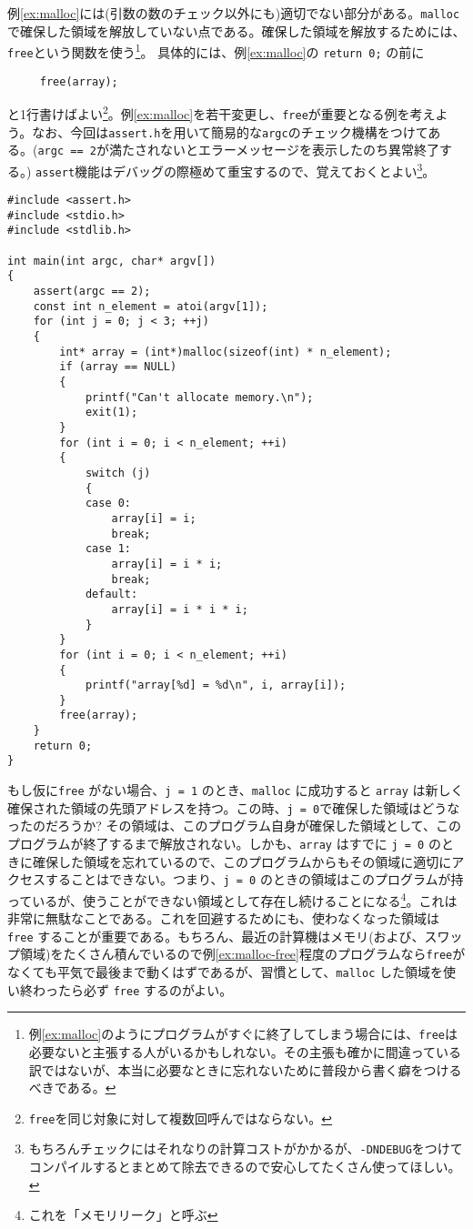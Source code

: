例\ref{ex:malloc}には(引数の数のチェック以外にも)適切でない部分がある。\texttt{malloc}で確保した領域を解放していない点である。確保した領域を解放するためには、\texttt{free}という関数を使う\footnote{例\ref{ex:malloc}のようにプログラムがすぐに終了してしまう場合には、\texttt{free}は必要ないと主張する人がいるかもしれない。その主張も確かに間違っている訳ではないが、本当に必要なときに忘れないために普段から書く癖をつけるべきである。}。
具体的には、例\ref{ex:malloc}の \texttt{return 0;} の前に
\begin{verbatim}
     free(array);
\end{verbatim}
と1行書けばよい\footnote{\texttt{free}を同じ対象に対して複数回呼んではならない。}。例\ref{ex:malloc}を若干変更し、\texttt{free}が重要となる例を考えよう。なお、今回は\texttt{assert.h}を用いて簡易的な\texttt{argc}のチェック機構をつけてある。(\texttt{argc == 2}が満たされないとエラーメッセージを表示したのち異常終了する。)
\texttt{assert}機能はデバッグの際極めて重宝するので、覚えておくとよい\footnote{もちろんチェックにはそれなりの計算コストがかかるが、\texttt{-DNDEBUG}をつけてコンパイルするとまとめて除去できるので安心してたくさん使ってほしい。}。
\begin{reidai}\label{ex:malloc-free}
    \begin{verbatim}
#include <assert.h>
#include <stdio.h>
#include <stdlib.h>

int main(int argc, char* argv[])
{
    assert(argc == 2);
    const int n_element = atoi(argv[1]);
    for (int j = 0; j < 3; ++j)
    {
        int* array = (int*)malloc(sizeof(int) * n_element);
        if (array == NULL)
        {
            printf("Can't allocate memory.\n");
            exit(1);
        }
        for (int i = 0; i < n_element; ++i)
        {
            switch (j)
            {
            case 0:
                array[i] = i;
                break;
            case 1:
                array[i] = i * i;
                break;
            default:
                array[i] = i * i * i;
            }
        }
        for (int i = 0; i < n_element; ++i)
        {
            printf("array[%d] = %d\n", i, array[i]);
        }
        free(array);
    }
    return 0;
}
\end{verbatim}
\end{reidai} \noindent
もし仮に\texttt{free} がない場合、\texttt{j = 1} のとき、\texttt{malloc} に成功すると \texttt{array} は新しく確保された領域の先頭アドレスを持つ。この時、\texttt{j = 0}で確保した領域はどうなったのだろうか? その領域は、このプログラム自身が確保した領域として、このプログラムが終了するまで解放されない。しかも、\texttt{array} はすでに \texttt{j = 0} のときに確保した領域を忘れているので、このプログラムからもその領域に適切にアクセスすることはできない。つまり、\texttt{j = 0} のときの領域はこのプログラムが持っているが、使うことができない領域として存在し続けることになる\footnote{これを「メモリリーク」と呼ぶ}。これは非常に無駄なことである。これを回避するためにも、使わなくなった領域は \texttt{free} することが重要である。もちろん、最近の計算機はメモリ(および、スワップ領域)をたくさん積んでいるので例\ref{ex:malloc-free}程度のプログラムなら\texttt{free}がなくても平気で最後まで動くはずであるが、習慣として、\texttt{malloc} した領域を使い終わったら必ず \texttt{free} するのがよい。

